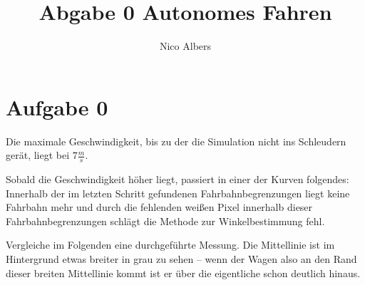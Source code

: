 \documentclass[12pt,final]{article}
\author{Nico Albers}
\title{Abgabe 0 Autonomes Fahren}
\begin{document}
\maketitle

\section{Aufgabe 0}
Die maximale Geschwindigkeit, bis zu der die Simulation nicht ins Schleudern gerät, liegt bei $7\frac{m}{s}$.

Sobald die Geschwindigkeit höher liegt, passiert in einer der Kurven folgendes:
Innerhalb der im letzten Schritt gefundenen Fahrbahnbegrenzungen liegt keine
Fahrbahn mehr und durch die fehlenden weißen Pixel innerhalb dieser Fahrbahnbegrenzungen
schlägt die Methode zur Winkelbestimmung fehl.

Vergleiche im Folgenden eine durchgeführte Messung.
Die Mittellinie ist im Hintergrund etwas breiter in grau zu sehen -- wenn der
Wagen also an den Rand dieser breiten Mittellinie kommt ist er über die eigentliche
schon deutlich hinaus.



\end{document}
